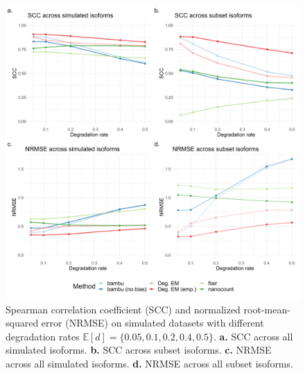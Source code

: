 \begin{figure}[H]
    \centering
    \includegraphics[width=\textwidth]{figures/sec-4-scc-nrmse.png}
    \caption[Empirical results for SCC and NRMSE on simulated datasets]{Spearman correlation coefficient (SCC) and normalized root-mean-squared error (NRMSE) on simulated datasets with different degradation rates $\mathbb{E}[d]=\{0.05,0.1,0.2,0.4,0.5\}$. \textbf{a.} SCC across all simulated isoforms. \textbf{b.} SCC across subset isoforms. \textbf{c.} NRMSE across all simulated isoforms. \textbf{d.} NRMSE across all subset isoforms.}
    \label{fig:sec-4-scc-nrmse}
\end{figure}

